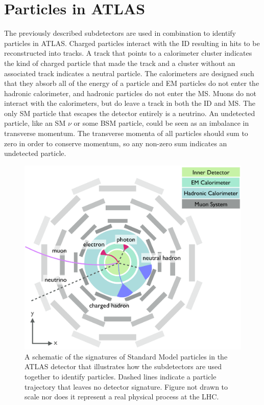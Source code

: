 \section{Particles in ATLAS}
The previously described subdetectors are used in combination to identify particles in \ac{ATLAS}. Charged particles interact with the \ac{ID} resulting in hits to be reconstructed into tracks. A track that points to a calorimeter cluster indicates the kind of charged particle that made the track and a cluster without an associated track indicates a neutral particle. The calorimeters are designed such that they absorb all of the energy of a particle and \ac{EM} particles do not enter the hadronic calorimeter, and hadronic particles do not enter the \ac{MS}. Muons do not interact with the calorimeters, but do leave a track in both the \ac{ID} and \ac{MS}. The only \ac{SM} particle that escapes the detector entirely is a neutrino. An undetected particle, like an \ac{SM} $\nu$ or some \ac{BSM} particle, could be seen as an imbalance in transverse momentum. The transverse momenta of all particles should sum to zero in order to conserve momentum, so any non-zero sum indicates an undetected particle.


\begin{figure}[htbp]
\centering
\includegraphics[width=.8\textwidth]{figures/Detector/particle-doodle.png}
\caption{A schematic of the signatures of Standard Model particles in the \ac{ATLAS} detector that illustrates how the subdetectors are used together to identify particles. Dashed lines indicate a particle trajectory that leaves no detector signature. Figure not drawn to scale nor does it represent a real physical process at the \ac{LHC}. }
\label{fig:particle-doodles}
\end{figure}




